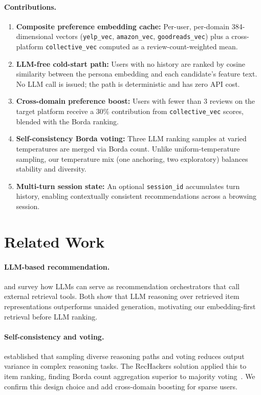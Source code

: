 \documentclass[11pt]{article}
\begin{document}
\paragraph{Contributions.}
\begin{enumerate}
  \item \textbf{Composite preference embedding cache:} Per-user, per-domain
    384-dimensional vectors (\texttt{yelp\_vec}, \texttt{amazon\_vec},
    \texttt{goodreads\_vec}) plus a cross-platform \texttt{collective\_vec}
    computed as a review-count-weighted mean.
  \item \textbf{LLM-free cold-start path:} Users with no history are ranked by
    cosine similarity between the persona embedding and each candidate's feature
    text. No LLM call is issued; the path is deterministic and has zero API cost.
  \item \textbf{Cross-domain preference boost:} Users with fewer than 3 reviews
    on the target platform receive a 30\% contribution from
    \texttt{collective\_vec} scores, blended with the Borda ranking.
  \item \textbf{Self-consistency Borda voting:} Three LLM ranking samples at
    varied temperatures are merged via Borda count.
    Unlike uniform-temperature sampling, our temperature mix (one anchoring,
    two exploratory) balances stability and diversity.
  \item \textbf{Multi-turn session state:} An optional \texttt{session\_id}
    accumulates turn history, enabling contextually consistent recommendations
    across a browsing session.
\end{enumerate}

\section{Related Work}

\paragraph{LLM-based recommendation.}
\citet{huang2025intrecagent} and \citet{lian2024recai} survey how LLMs can
serve as recommendation orchestrators that call external retrieval tools.
Both show that LLM reasoning over retrieved item representations outperforms
unaided generation, motivating our embedding-first retrieval before LLM ranking.

\paragraph{Self-consistency and voting.}
\citet{wang2023selfconsistency} established that sampling diverse reasoning
paths and voting reduces output variance in complex reasoning tasks.
The RecHackers solution applied this to item ranking, finding Borda count
aggregation superior to majority
voting~\citep{guo2025agentsocietychallenge}.
We confirm this design choice and add cross-domain boosting for sparse users.
\end{document}
